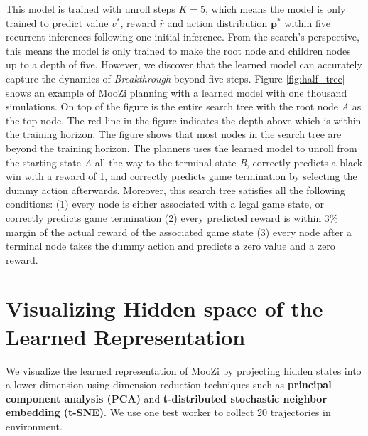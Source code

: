 

This model is trained with unroll steps $K = 5$, which means the model is only trained to predict value \(v^{*}\), reward \(\hat{r}\) and action distribution \(\mathbf{p}^{*}\) within five recurrent inferences following one initial inference.
From the search's perspective, this means the model is only trained to make the root node and children nodes up to a depth of five.
However, we discover that the learned model can accurately capture the dynamics of \textit{Breakthrough} beyond five steps.
Figure \ref{fig:half_tree} shows an example of MooZi planning with a learned model with one thousand simulations.
On top of the figure is the entire search tree with the root node \textit{A} as the top node.
The red line in the figure indicates the depth above which is within the training horizon.
The figure shows that most nodes in the search tree are beyond the training horizon.
The planners uses the learned model to unroll from the starting state \textit{A} all the way to the terminal state \textit{B}, correctly predicts a black win with a reward of 1, and correctly predicts game termination by selecting the dummy action afterwards.
Moreover, this search tree satisfies all the following conditions: (1) every node is either associated with a legal game state, or  correctly predicts game termination (2) every predicted reward is within 3\% margin of the actual reward of the associated game state (3) every node after a terminal node takes the dummy action and predicts a zero value and a zero reward.

\section{Visualizing Hidden space of the Learned Representation}
We visualize the learned representation of MooZi by projecting hidden states into a lower dimension using dimension reduction techniques such as \textbf{principal component analysis (PCA)} and \textbf{t-distributed stochastic neighbor embedding (t-SNE)}.
We use one test worker to collect 20 trajectories in environment.